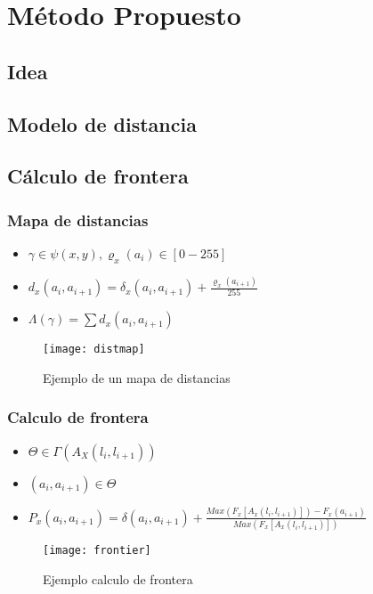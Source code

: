 \documentclass[spanish]{beamer}
\begin{document}
\section{Método Propuesto}
\subsection{Idea}
\subsection{Modelo de distancia}
\subsection{Cálculo de frontera}

\begin{frame}
\frametitle{Mapa de distancias}
\begin{itemize}
    \centering
	\item[] $\gamma \in \psi(x,y), \varrho_{x}(a_{i}) \in [0-255]$
            \vspace{7}
	\item[] $ d_{x}(a_{i},a_{i+1})= \delta_{x}(a_{i},a_{i+1}) + \frac{\varrho_{x}(a_{i+1})}{255} $
	        \vspace{7}
	\item[] $ \Lambda(\gamma )=\sum d_{x}(a_{i},a_{i+1}) $
	        \vspace{7}

\end{itemize}
\begin{figure}[H]
    \centering
    \texttt{[image: distmap]}
    \caption{Ejemplo de un mapa de distancias}
\end{figure}

\end{frame}


\begin{frame}
\frametitle{Calculo de frontera}

\begin{itemize}
    \centering
	\item[] $\Theta  \in \Gamma (A_{X}(l_i, l_{i+1})) $
            \vspace{7}
	\item[] $ (a_i,a_{i+1}) \in \Theta$
	        \vspace{7}
	\item[] $P_x (a_i,a_{i+1}) = \delta (a_i,a_{i+1}) + \frac{Max(F_x[A_x(l_i,l_{i+1})]) - F_x(a_{i+1})}{Max(F_x[A_x(l_i,l_{i+1})])} $
	        \vspace{7}
\end{itemize}
\begin{figure}[H]
    \centering
    \texttt{[image: frontier]}
    \caption{Ejemplo calculo de frontera}
\end{figure}
\end{frame}
\end{document}

